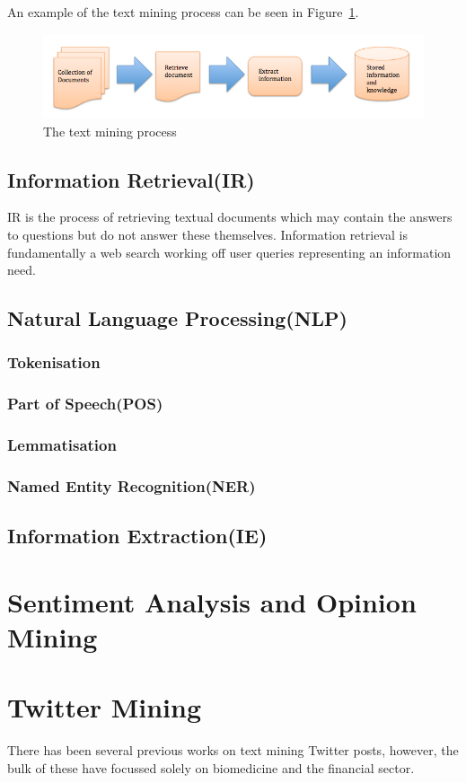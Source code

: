 An example of the text mining process can be seen in Figure~\ref{fig:tm}.
\begin{figure}
\begin{center}
\includegraphics[width=15cm]{tm}
\end{center}
\caption{The text mining process\cite{Gupta_Lehal_2009}}
\label{fig:tm}
\end{figure}


\subsection[Information Retrieval]{Information Retrieval(IR)}
IR is the process of retrieving textual documents which may contain the answers to questions but do not answer these themselves\cite{hotho-etal-ldv-2005}. Information retrieval is fundamentally a web search working off user queries representing an information need. 


\subsection[Natural Language Processing]{Natural Language Processing(NLP)}
\subsubsection{Tokenisation}
\subsubsection{Part of Speech(POS)}
\subsubsection{Lemmatisation}
\subsubsection{Named Entity Recognition(NER)}

\subsection[Information Extraction]{Information Extraction(IE)}


\section[Sentiment Analysis]{Sentiment Analysis and Opinion Mining}

\section{Twitter Mining}
There has been several previous works on text mining Twitter posts, however, the bulk of these have focussed solely on biomedicine and the financial sector.


